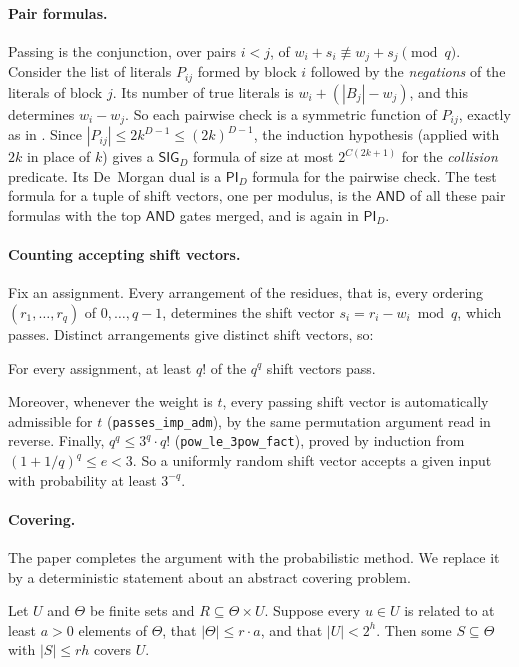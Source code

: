 \documentclass[11pt]{article}
\newcommand{\isa}[1]{\texttt{#1}}
\newcommand{\sig}{\mathsf{SIG}}
\newcommand{\piC}{\mathsf{PI}}
\newcommand{\AND}{\mathsf{AND}}
\begin{document}
\paragraph{Pair formulas.} Passing is the conjunction, over pairs $i < j$, of $w_i + s_i \not\equiv w_j + s_j \pmod q$. Consider the list of literals $P_{ij}$ formed by block $i$ followed by the \emph{negations} of the literals of block $j$. Its number of true literals is $w_i + (|B_j| - w_j)$, and this determines $w_i - w_j$. So each pairwise check is a symmetric function of $P_{ij}$, exactly as in \citet[Section~4]{LR26}. Since $|P_{ij}| \le 2k^{D-1} \le (2k)^{D-1}$, the induction hypothesis (applied with $2k$ in place of $k$) gives a $\sig_D$ formula of size at most $2^{C(2k+1)}$ for the \emph{collision} predicate. Its De~Morgan dual is a $\piC_D$ formula for the pairwise check. The test formula for a tuple of shift vectors, one per modulus, is the $\AND$ of all these pair formulas with the top $\AND$ gates merged, and is again in $\piC_D$.

\paragraph{Counting accepting shift vectors.} Fix an assignment. Every arrangement of the residues, that is, every ordering $(r_1, \dots, r_q)$ of $0, \dots, q-1$, determines the shift vector $s_i = r_i - w_i \bmod q$, which passes. Distinct arrangements give distinct shift vectors, so:

\begin{lemma}[\isa{card\_accepting\_shifts}]
For every assignment, at least $q!$ of the $q^q$ shift vectors pass.
\end{lemma}

Moreover, whenever the weight is $t$, every passing shift vector is automatically admissible for $t$ (\isa{passes\_imp\_adm}), by the same permutation argument read in reverse. Finally, $q^q \le 3^q \cdot q!$ (\isa{pow\_le\_3pow\_fact}), proved by induction from $(1 + 1/q)^q \le e < 3$. So a uniformly random shift vector accepts a given input with probability at least $3^{-q}$.

\paragraph{Covering.} The paper completes the argument with the probabilistic method. We replace it by a deterministic statement about an abstract covering problem.

\begin{lemma}[\isa{cover}]
Let $U$ and $\Theta$ be finite sets and $R \subseteq \Theta \times U$. Suppose every $u \in U$ is related to at least $a > 0$ elements of $\Theta$, that $|\Theta| \le r \cdot a$, and that $|U| < 2^h$. Then some $S \subseteq \Theta$ with $|S| \le r h$ covers $U$.
\end{lemma}
\end{document}
